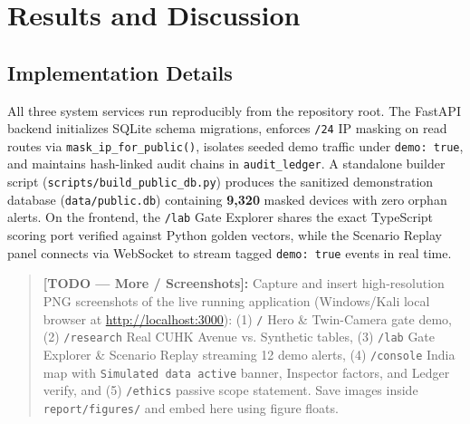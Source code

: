 \chapter{Results and Discussion}

\section{Implementation Details}
All three system services run reproducibly from the repository root. The FastAPI backend initializes SQLite schema migrations, enforces \texttt{/24} IP masking on read routes via \texttt{mask\_ip\_for\_public()}, isolates seeded demo traffic under \texttt{demo: true}, and maintains hash-linked audit chains in \texttt{audit\_ledger}. A standalone builder script (\texttt{scripts/build\_public\_db.py}) produces the sanitized demonstration database (\texttt{data/public.db}) containing \textbf{9,320} masked devices with zero orphan alerts. On the frontend, the \texttt{/lab} Gate Explorer shares the exact TypeScript scoring port verified against Python golden vectors, while the Scenario Replay panel connects via WebSocket to stream tagged \texttt{demo: true} events in real time.

\begin{quote}
\textbf{[TODO — More / Screenshots]:} Capture and insert high-resolution PNG screenshots of the live running application (Windows/Kali local browser at \url{http://localhost:3000}): (1) \texttt{/} Hero \& Twin-Camera gate demo, (2) \texttt{/research} Real CUHK Avenue vs. Synthetic tables, (3) \texttt{/lab} Gate Explorer \& Scenario Replay streaming 12 demo alerts, (4) \texttt{/console} India map with \texttt{Simulated data active} banner, Inspector factors, and Ledger verify, and (5) \texttt{/ethics} passive scope statement. Save images inside \texttt{report/figures/} and embed here using figure floats.
\end{quote}

